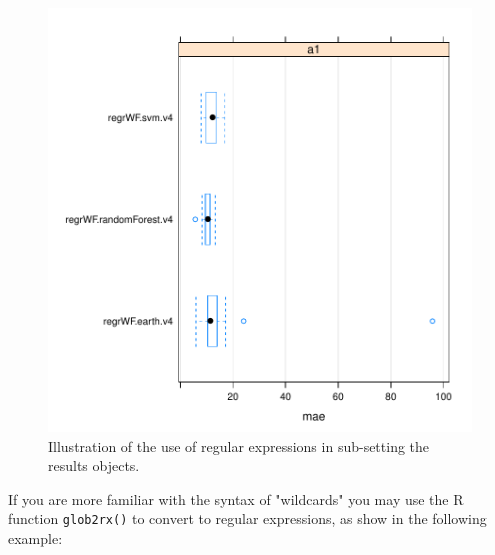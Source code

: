 \documentclass[10pt,a4paper]{article}
\begin{document}
\begin{figure}[ht]
  \centering
\begin{Schunk}
\end{Schunk}
\includegraphics{compExps-031}
  \caption{Illustration of the use of regular expressions in sub-setting the results objects.}
  \label{fig:maeA1b}
\end{figure}

If you are more familiar with the syntax of "wildcards" you may use
the R function \texttt{glob2rx()} to convert to regular expressions,
as show in the following example:
\end{document}
